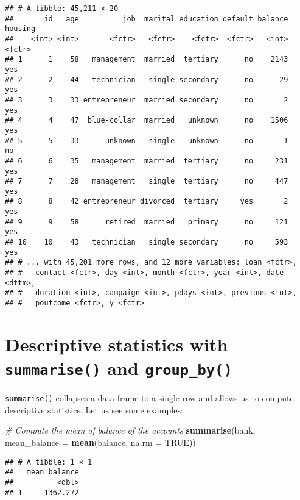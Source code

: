\documentclass[]{book}
\newenvironment{Shaded}{\begin{snugshade}}{\end{snugshade}}
\newcommand{\KeywordTok}[1]{\textcolor[rgb]{0.13,0.29,0.53}{\textbf{{#1}}}}
\newcommand{\DataTypeTok}[1]{\textcolor[rgb]{0.13,0.29,0.53}{{#1}}}
\newcommand{\CommentTok}[1]{\textcolor[rgb]{0.56,0.35,0.01}{\textit{{#1}}}}
\newcommand{\OtherTok}[1]{\textcolor[rgb]{0.56,0.35,0.01}{{#1}}}
\newcommand{\NormalTok}[1]{{#1}}
\begin{document}
\begin{verbatim}
## # A tibble: 45,211 × 20
##       id   age          job  marital education default balance housing
##    <int> <int>       <fctr>   <fctr>    <fctr>  <fctr>   <int>  <fctr>
## 1      1    58   management  married  tertiary      no    2143     yes
## 2      2    44   technician   single secondary      no      29     yes
## 3      3    33 entrepreneur  married secondary      no       2     yes
## 4      4    47  blue-collar  married   unknown      no    1506     yes
## 5      5    33      unknown   single   unknown      no       1      no
## 6      6    35   management  married  tertiary      no     231     yes
## 7      7    28   management   single  tertiary      no     447     yes
## 8      8    42 entrepreneur divorced  tertiary     yes       2     yes
## 9      9    58      retired  married   primary      no     121     yes
## 10    10    43   technician   single secondary      no     593     yes
## # ... with 45,201 more rows, and 12 more variables: loan <fctr>,
## #   contact <fctr>, day <int>, month <fctr>, year <int>, date <dttm>,
## #   duration <int>, campaign <int>, pdays <int>, previous <int>,
## #   poutcome <fctr>, y <fctr>
\end{verbatim}

\section{\texorpdfstring{Descriptive statistics with
\texttt{summarise()} and
\texttt{group\_by()}}{Descriptive statistics with summarise() and group\_by()}}\label{descriptive-statistics-with-summarise-and-group_by}

\texttt{summarise()} collapses a data frame to a single row and allows
us to compute descriptive statistics. Let us see some examples:

\begin{Shaded}
\begin{Highlighting}[]
\CommentTok{# Compute the mean of balance of the accounts}
\KeywordTok{summarise}\NormalTok{(bank, }\DataTypeTok{mean_balance =} \KeywordTok{mean}\NormalTok{(balance, }\DataTypeTok{na.rm =} \OtherTok{TRUE}\NormalTok{))}
\end{Highlighting}
\end{Shaded}

\begin{verbatim}
## # A tibble: 1 × 1
##   mean_balance
##          <dbl>
## 1     1362.272
\end{verbatim}
\end{document}
